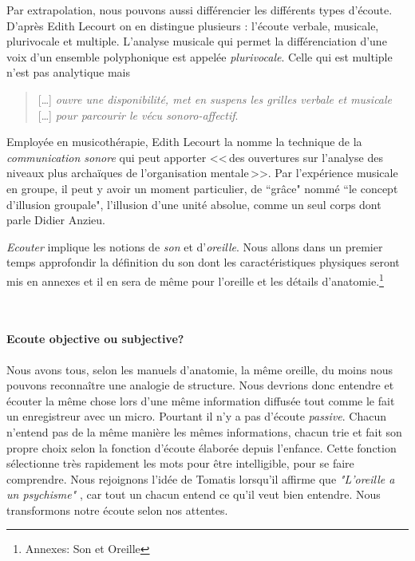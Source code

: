 Par extrapolation, nous pouvons aussi différencier les différents types d'écoute. D'après Edith Lecourt \autocite[ch. 10 <<\,De l'écoute verbale à l'écoute musicale\,>>, p. 182.]{lecourt:decouvrir}
 on en distingue plusieurs : l'écoute verbale, musicale, plurivocale et multiple.
 L'analyse musicale qui permet la différenciation d'une voix d'un ensemble polyphonique est appelée \emph{plurivocale}. Celle qui est multiple n'est pas analytique  mais 
 \begin{quote}
 	 [\ldots] \textit{ouvre une disponibilité, met en suspens les grilles verbale et musicale} [\ldots] \emph{pour parcourir le vécu sonoro-affectif}\autocite[p. 183]{lecourt:decouvrir}.
 \end{quote}
 Employée en musicothérapie, Edith Lecourt la nomme la technique de la  \emph{communication sonore} qui peut apporter 
 <<\,des ouvertures sur l'analyse des niveaux plus archaïques de l'organisation mentale\,>>\autocite[p. 154]{lecourt:decouvrir}.	
 Par l'expérience musicale en groupe, il peut y avoir un moment
 particulier, de ``grâce"  nommé ``le concept d'illusion groupale",
 l'illusion d'une unité absolue, comme un seul corps \autocite{anzieu:groupal} dont parle Didier Anzieu.


 
\emph{Ecouter} implique les notions de \emph{son} et
d'\emph{oreille}. Nous allons dans un premier temps approfondir  la
définition du son dont les caractéristiques physiques seront mis en
annexes et il en sera de même pour l'oreille et les détails
d'anatomie.\footnote{Annexes: Son et Oreille}

\







\paragraph{Ecoute objective ou subjective?}

Nous avons tous,
selon les manuels d'anatomie, la même
oreille, du moins nous pouvons reconnaître une analogie de structure. Nous devrions donc entendre et écouter la même chose
lors d'une même information diffusée tout comme le fait un enregistreur avec un micro. Pourtant il n'y a pas d'écoute \emph{passive}. Chacun n'entend pas de la même manière les mêmes
informations, chacun trie et fait son propre choix selon la fonction
d'écoute élaborée depuis l'enfance. Cette fonction sélectionne très
rapidement les mots pour être intelligible, pour se faire
comprendre. Nous rejoignons l'idée de Tomatis lorsqu'il affirme que
\textit{"L'oreille a un psychisme"} , car tout un chacun entend ce qu'il veut bien
entendre. \autocite{tomatis_oreille_1998} 
Nous transformons notre écoute selon nos attentes.

